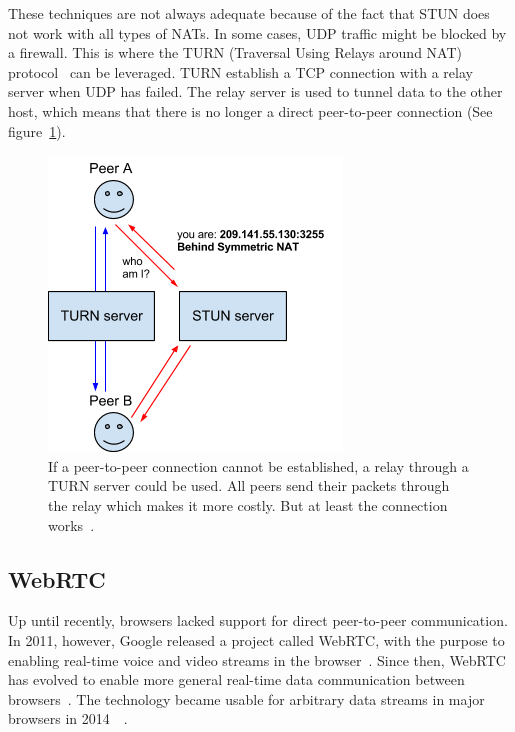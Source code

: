 These techniques are not always adequate because of the fact that STUN does not work with all types of NATs. In some cases, UDP traffic might be blocked by a firewall. This is where the TURN (Traversal Using Relays around NAT) protocol~\cite{RFC5766:Online} can be leveraged.  TURN establish a TCP connection with a relay server when UDP has failed. The relay server is used to tunnel data to the other host, which means that there is no longer a direct peer-to-peer connection (See figure~\ref{fig:WebRTC - TURN}).

\begin{figure}[htp]
\centering
\includegraphics[width=\textwidth,height=0.2\paperheight,keepaspectratio
]{figures/webrtc-turn}
\caption{If a peer-to-peer connection cannot be established, a relay through a TURN server could be used. All peers send their packets through the relay which makes it more costly. But at least the connection works~\cite{WebRTCArchitecture:2014:Online}.}
\label{fig:WebRTC - TURN}
\end{figure}

\subsection{WebRTC}

Up until recently, browsers lacked support for direct peer-to-peer communication. In 2011, however, Google released a project called WebRTC, with the purpose to enabling real-time voice and video streams in the browser~\cite{WebRTCMemo:Online}. Since then, WebRTC has evolved to enable more general real-time data communication between browsers~\cite{WebRTC:Online}. The technology became usable for arbitrary data streams in major browsers in 2014~\cite{WebRTCChrome:Online}~\cite{WebRTCFirefox:Online}.

